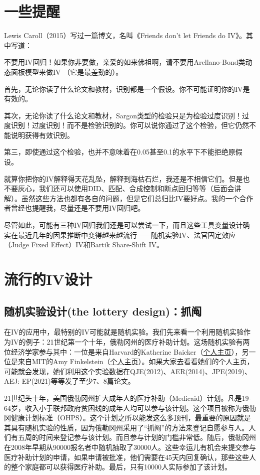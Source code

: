 \documentclass[cn,12pt,math=newtx,citestyle=gb7714-2015,bibstyle=gb7714-2015]{elegantbook}
\begin{document}
	
	\section{一些提醒}
	
	Lewis Caroll（2015）写过一篇博文，名叫《Friends don't let Friends do IV》。其中写道：
	
	不要用IV回归！如果你非要做，亲爱的如来佛祖啊，请不要用Arellano-Bond类动态面板模型来做IV （它是最差劲的）。
	
	首先，无论你读了什么论文和教材，识别都是一个假设。你不可能证明你的IV是有效的。
	
	其次，无论你读了什么论文和教材，Sargon类型的检验只是为检验过度识别！过度识别！过度识别！而不是检验识别的。你可以说你通过了这个检验，但它仍然不能说明获得有效识别。
	
	第三，即使通过这个检验，也并不意味着在0.05甚至0.1的水平下不能拒绝原假设。
	
	就算你把你的IV解释得天花乱坠，解释到海枯石烂，我还是不相信它们。但是也不要灰心，我们还可以使用DID、匹配、合成控制和断点回归等等（后面会讲解）。虽然这些方法也都有各自的问题，但是它们总归比IV要好点。我的一个合作者曾经也提醒我，尽量还是不要用IV回归吧。
	
	尽管如此，可能有三种IV回归我们还是可以尝试一下，而且这些工具变量设计确实在最近几年的因果推断中变得越来越流行——随机实验IV、法官固定效应（Judge Fixed Effect）IV和Bartik Share-Shift IV。
	
	
	\section{流行的IV设计}
	\subsection{随机实验设计(the lottery design)：抓阄}
	
	在IV的应用中，最特别的IV可能就是随机实验。我们先来看一个利用随机实验作为IV的例子：21世纪第一个十年，俄勒冈州的医疗补助计划。这场随机实验有两位经济学家参与其中：一位是来自Harvard的Katherine Baicker（\href{https://connects.catalyst.harvard.edu/Profiles/display/Person/40507}{个人主页}），另一位是来自MIT的Amy Finkelstein（\href{http://economics.mit.edu/faculty/afink}{个人主页}）。如果大家去看看她们的个人主页，可能就会发现，她们利用这个实验数据在QJE(2012)、AER(2014)、JPE(2019)、AEJ: EP(2021)等等发了至少7、8篇论文。
	
	21世纪头十年，美国俄勒冈州扩大成年人的医疗补助（Medicaid）计划。凡是19-64岁，收入小于联邦政府贫困线的成年人均可以参与该计划。这个项目被称为俄勒冈健康计划标准（OHPS）。这个计划之所以能发这么多顶刊，最重要的原因就是其具有随机实验的性质，因为俄勒冈州采用了“抓阄”的方法来登记自愿参与人。人们有五周的时间来登记参与该计划。而且参与计划的门槛非常低。随后，俄勒冈州在2008年早期从90000报名者中随机抽取了30000人。这些幸运儿有机会来提交参与医疗补助计划的申请，如果申请被批准，他们需要在45天内回复确认，那些这些人的整个家庭都可以获得医疗补助。最后，只有10000人实际参加了该计划。
	
\end{document}
